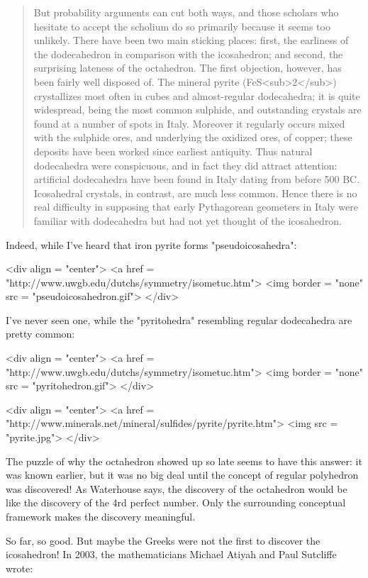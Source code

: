 \begin{quote}
   But probability arguments can cut both ways, and those scholars 
   who hesitate to accept the scholium do so primarily because it 
   seems too unlikely.  There have been two main sticking places: 
   first, the earliness of the dodecahedron in comparison with the 
   icosahedron; and second, the surprising lateness of the octahedron.
   The first objection, however, has been fairly well disposed of.  
   The mineral pyrite (FeS<sub>2</sub>) crystallizes most often in cubes and 
   almost-regular dodecahedra; it is quite widespread, being the most 
   common sulphide, and outstanding crystals are found at a number 
   of spots in Italy.  Moreover it regularly occurs mixed with the 
   sulphide ores, and underlying the oxidized ores, of copper; these 
   deposits have been worked since earliest antiquity.  Thus natural 
   dodecahedra were conspicuous, and in fact they did attract 
   attention: artificial dodecahedra have been found in Italy dating 
   from before 500 BC.  Icosahedral crystals, in contrast, are much
   less common.  Hence there is no real difficulty in supposing that 
   early Pythagorean geometers in Italy were familiar with dodecahedra 
   but had not yet thought of the icosahedron.
\end{quote}
    

Indeed, while I've heard that iron pyrite forms "pseudoicosahedra":

<div align = "center">
<a href = "http://www.uwgb.edu/dutchs/symmetry/isometuc.htm">
<img border = "none" src = "pseudoicosahedron.gif">
</div>

I've never seen one, while the "pyritohedra" resembling regular 
dodecahedra are pretty common:

<div align = "center">
<a href = "http://www.uwgb.edu/dutchs/symmetry/isometuc.htm">
<img border = "none" src = "pyritohedron.gif">
</div>

<div align = "center">
<a href = "http://www.minerals.net/mineral/sulfides/pyrite/pyrite.htm">
<img src = "pyrite.jpg">
</div>



The puzzle of why the octahedron showed up so late seems to have this
answer: it was known earlier, but it was no big deal until the concept of
regular polyhedron was discovered!  As Waterhouse says, the discovery
of the octahedron would be like the discovery of the 4rd perfect number.
Only the surrounding conceptual framework makes the discovery 
meaningful.

So far, so good.  But maybe the Greeks were not the first to discover 
the icosahedron!  In 2003, the mathematicians Michael Atiyah and 
Paul Sutcliffe wrote:

